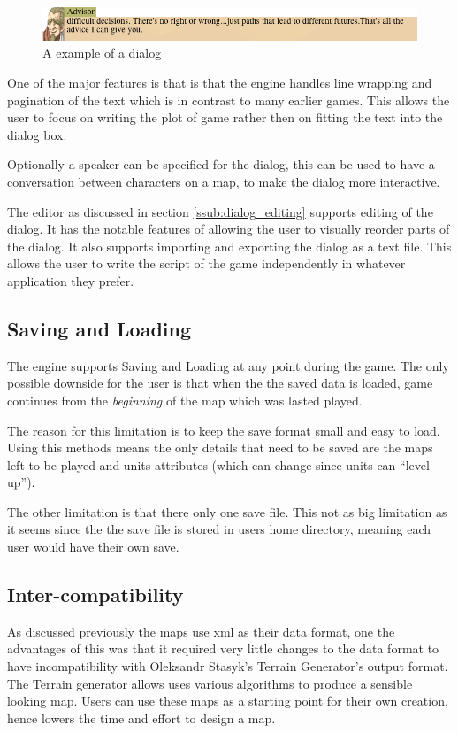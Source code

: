 \begin{figure}[htbp]
	\centering
		\includegraphics[width=6.3in]{figures/dialog2.png}
	\caption{A example of a dialog}
	\label{fig:figures_dialog2}
\end{figure}

One of the major features is that is that the engine handles line wrapping and pagination of the text which is in contrast to many earlier games. This allows the user to focus on writing the plot of game rather then on fitting the text into the dialog box. 

Optionally a speaker can be specified for the dialog, this can be used to have a conversation between characters on a map, to make the dialog more interactive. 

The editor as discussed in section \ref{ssub:dialog_editing} supports editing of the dialog. It has the notable features of allowing the user to visually reorder parts of the dialog. It also supports   importing and exporting the dialog as a text file.  This allows the user to write the script of the game independently in whatever application they prefer. 


\subsection{Saving and Loading}
The engine supports Saving and Loading at any point during the game. The only possible downside  for the user is that when the the saved data is loaded, game continues from the \emph{beginning} of the map which was lasted played. 

The reason for this limitation is to keep the save format small and easy to load. Using this methods means the only details that need to be saved are the maps left to be played and units attributes (which can change since units can ``level up''). 

The other limitation is that there only one save file. This not as big limitation as it seems since the the save file is stored in users home directory, meaning each user would have their own save.

\subsection{Inter-compatibility}
\label{ssub:intercompatibility}
As discussed previously the maps use xml as their data format, one the advantages of this was that it required very little changes to the data format to have incompatibility with Oleksandr Stasyk's  Terrain Generator's output format.  The Terrain generator allows uses various algorithms to produce a sensible looking map. Users can use these maps as a starting point for their own creation, hence lowers the time and effort to design a map.

